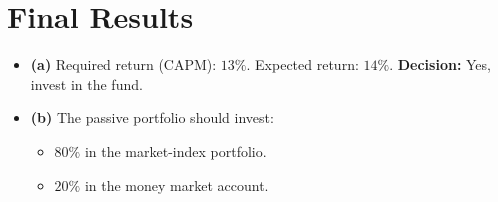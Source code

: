 \documentclass{article}
\begin{document}
\section*{\textbf{Final Results}}

\begin{itemize}
    \item \textbf{(a)} Required return (CAPM): \( 13\% \). Expected return: \( 14\% \).  
    \textbf{Decision:} Yes, invest in the fund.
    \item \textbf{(b)} The passive portfolio should invest:
    \begin{itemize}
        \item \( 80\% \) in the market-index portfolio.
        \item \( 20\% \) in the money market account.
    \end{itemize}
\end{itemize}
\end{document}
